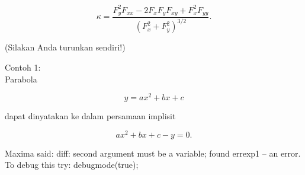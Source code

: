\documentclass[a4paper,10pt]{article}
\begin{document}
\begin{eulernotebook}
\begin{eulercomment}
\end{eulercomment}
\begin{eulerformula}
\[
\kappa =\frac {F_y^2F_{xx}-2F_xF_yF_{xy}+F_x^2F_{yy}}{\left(F_x^2+F_y^2\right)^{3/2}}.
\]
\end{eulerformula}
\begin{eulercomment}
(Silakan Anda turunkan sendiri!)

Contoh 1:\\
Parabola 

\end{eulercomment}
\begin{eulerformula}
\[
y=ax^2+bx+c
\]
\end{eulerformula}
\begin{eulercomment}
dapat dinyatakan ke dalam persamaan implisit

\end{eulercomment}
\begin{eulerformula}
\[
ax^2+bx+c-y=0.
\]
\end{eulerformula}
\begin{euleroutput}
  Maxima said:
  diff: second argument must be a variable; found errexp1
   -- an error. To debug this try: debugmode(true);
  

\end{euleroutput}
\end{eulernotebook}
\end{document}
